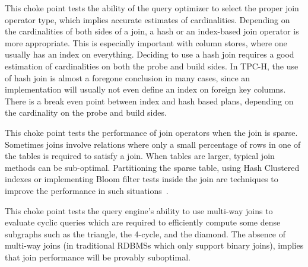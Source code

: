 



This choke point tests the ability of the query optimizer to select the proper join operator type, which implies accurate estimates of cardinalities.
Depending on the cardinalities of both sides of a join, a hash or an index-based join operator is more appropriate.
This is especially important with column stores, where one usually has an index on everything. Deciding to use a hash join requires a good estimation of cardinalities on both the probe and build sides.
In TPC-H, the use of hash join is almost a foregone conclusion in many cases, since an implementation will usually not even define an index on foreign key columns.
There is a break even point between index and hash based plans, depending on the cardinality on the probe and build sides.





This choke point tests the performance of join operators when the join is sparse. Sometimes joins involve relations where only a small percentage of rows in one of the tables is required to satisfy a join. When tables are larger, typical join methods can be sub-optimal. Partitioning the sparse table, using Hash Clustered indexes or implementing Bloom filter tests inside the join are techniques to improve the performance in such situations~\cite{DBLP:journals/csur/Graefe93}.





This choke point tests the query engine's ability to use multi-way joins to evaluate cyclic queries which are required to efficiently compute some dense subgraphs such as the triangle, the 4-cycle, and the diamond. The absence of multi-way joins (\eg in traditional RDBMSs which only support binary joins), implies that join performance will be provably suboptimal.



